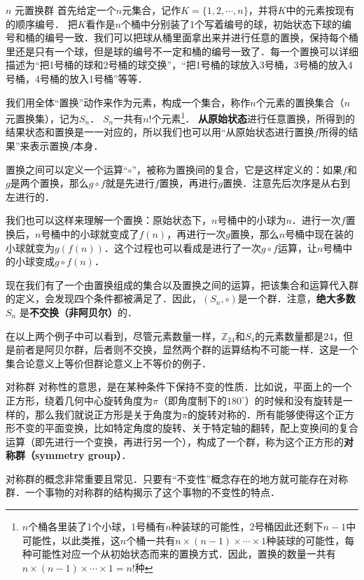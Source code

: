\begin{example}{$n$ 元置换群}\label{Group_ex3}
首先给定一个$n$元集合，记作$K=\{1,2, \cdots, n\}$，并将$K$中的元素按现有的顺序编号． 把$K$看作是$n$个桶中分别装了1个写着编号的球，初始状态下球的编号和桶的编号一致．我们可以把球从桶里面拿出来并进行任意的置换，保持每个桶里还是只有一个球，但是球的编号不一定和桶的编号一致了．每一个置换可以详细描述为“把1号桶的球和2号桶的球交换”，“把1号桶的球放入3号桶，3号桶的放入4号桶，4号桶的放入1号桶”等等．

我们用全体“置换”动作来作为元素，构成一个集合，称作$n$个元素的置换集合（$n$元置换集），记为$S_n$． $S_n$一共有$n!$个元素\footnote{$n$个桶各里装了1个小球，1号桶有$n$种装球的可能性，2号桶因此还剩下$n-1$中可能性，以此类推，这$n$个桶一共有$n\times(n-1)\times\cdots\times1$种装球的可能性，每种可能性对应一个从初始状态而来的置换方式．因此，置换的数量一共有$n\times(n-1)\times\cdots\times1=n!$种}． \textbf{从原始状态}进行任意置换，所得到的结果状态和置换是一一对应的，所以我们也可以用“从原始状态进行置换$f$所得的结果”来表示置换$f$本身．

置换之间可以定义一个运算“$\circ$”，被称为置换间的复合，它是这样定义的：如果$f$和$g$是两个置换，那么$g\circ f$就是先进行$f$置换，再进行$g$置换．注意先后次序是从右到左进行的．

我们也可以这样来理解一个置换：原始状态下，$n$号桶中的小球为$n$．进行一次$f$置换后，$n$号桶中的小球就变成了$f(n)$，再进行一次$g$置换，那么$n$号桶中现在装的小球就变为$g(f(n))$．这个过程也可以看成是进行了一次$g\circ f$运算，让$n$号桶中的小球变成$g\circ f(n)$．

现在我们有了一个由置换组成的集合以及置换之间的运算，把该集合和运算代入群的定义，会发现四个条件都被满足了．因此，$(S_n, \circ)$是一个群．注意，\textbf{绝大多数} $S_n$ 是\textbf{不交换（非阿贝尔）}的．
\end{example}

在以上两个例子中可以看到，尽管元素数量一样，$\mathbb{Z}_{24}$和$S_4$的元素数量都是24，但是前者是阿贝尔群，后者则不交换，显然两个群的运算结构不可能一样．这是一个集合论意义上等价但群论意义上不等价的例子．

\begin{example}{对称群}\label{Group_ex4}
对称性的意思，是在某种条件下保持不变的性质．比如说，平面上的一个正方形，绕着几何中心旋转角度为$\pi$（即角度制下的$180^\circ$）的时候和没有旋转是一样的，那么我们就说正方形是关于角度为$\pi$的旋转对称的．所有能够使得这个正方形不变的平面变换，比如特定角度的旋转、关于特定轴的翻转，配上变换间的复合运算（即先进行一个变换，再进行另一个），构成了一个群，称为这个正方形的\textbf{对称群（symmetry group）}．
\end{example}
对称群的概念非常重要且常见．只要有“不变性”概念存在的地方就可能存在对称群．一个事物的对称群的结构揭示了这个事物的不变性的特点．

